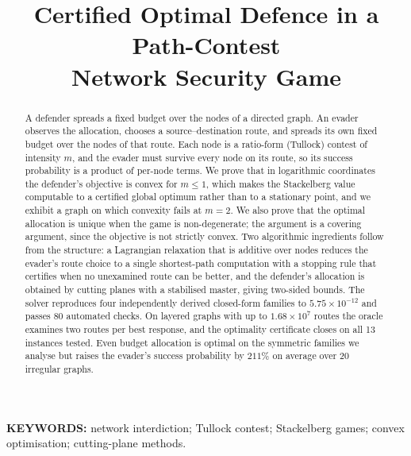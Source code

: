 \documentclass[10pt,a4paper,twoside]{article}
\theoremstyle{plain}
\theoremstyle{definition}
\begin{document}
\title{\bf Certified Optimal Defence in a Path-Contest\\ Network Security Game}

\author{}
\date{}
\maketitle

\begin{abstract}
\noindent
A defender spreads a fixed budget over the nodes of a directed graph. An
evader observes the allocation, chooses a source--destination route, and
spreads its own fixed budget over the nodes of that route. Each node is a
ratio-form (Tullock) contest of intensity $m$, and the evader must survive
every node on its route, so its success probability is a product of per-node
terms. We prove that in logarithmic coordinates the defender's objective is
convex for $m\le1$, which makes the Stackelberg value computable to a
certified global optimum rather than to a stationary point, and we exhibit a
graph on which convexity fails at $m=2$. We also prove that the optimal
allocation is unique when the game is non-degenerate; the argument is a
covering argument, since the objective is not strictly convex. Two
algorithmic ingredients follow from the structure: a Lagrangian relaxation
that is additive over nodes reduces the evader's route choice to a single
shortest-path computation with a stopping rule that certifies when no
unexamined route can be better, and the defender's allocation is obtained by
cutting planes with a stabilised master, giving two-sided bounds. The solver
reproduces four independently derived closed-form families to
$5.75\times10^{-12}$ and passes 80 automated checks. On layered graphs with
up to $1.68\times10^{7}$ routes the oracle examines two routes per best
response, and the optimality certificate closes on all 13 instances tested.
Even budget allocation is optimal on the symmetric families we analyse but
raises the evader's success probability by $211\%$ on average over 20
irregular graphs.
\end{abstract}

\noindent\textbf{KEYWORDS:} network interdiction; Tullock contest;
Stackelberg games; convex optimisation; cutting-plane methods.

\medskip

\end{document}
